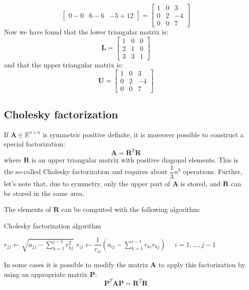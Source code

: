 \documentclass[12pt, a4paper]{report}
\begin{document}
\begin{example}
\[\begin{bmatrix}
            0-0 & 6-6 & -5+12
        \end{bmatrix}=
        \begin{bmatrix}
            1 & 0 & 3 \\
            0 & 2 & -4 \\
            0 & 0 & 7
        \end{bmatrix}\]
        Now we have found that the lower triangular matrix is: 
        \[\boldsymbol{L}=
        \begin{bmatrix}
            1 & 0 & 0 \\
            2 & 1 & 0 \\
            3 & 3 & 1
        \end{bmatrix}\]
        and that the upper triangular matrix is: 
        \[\boldsymbol{U}=
        \begin{bmatrix}
            1 & 0 & 3 \\
            0 & 2 & -4 \\
            0 & 0 & 7
        \end{bmatrix}\]
    \end{example}

    \subsection{Cholesky factorization}
    If $\boldsymbol{A} \in \mathbb{R}^{n \times n}$ is symmetric positive definite, it is moreover possible to construct a special factorization: 
    \[\boldsymbol{A}=\boldsymbol{R}^T\boldsymbol{R}\]
    where $\boldsymbol{R}$ is an upper triangular matrix with positive diagonal elements. This is the so-called Cholesky factorization and requires about $\dfrac{1}{3}n^3$
    operations. Further, let's note that, due to symmetry, only the upper part of $\boldsymbol{A}$ is stored, and $\boldsymbol{R}$ can be stored in the same area. 

    The elements of $\boldsymbol{R}$ can be computed with the following algorithm: 
    \begin{algorithm}[H]
        \caption{Cholesky factorization algorithm}
            \begin{algorithmic}
                \State $r_{jj}\leftarrow\sqrt{a_{jj}-\sum_{k=1}^{j-1}r_{kj}^2}$
                \State $r_{ij}\leftarrow\dfrac{1}{r_{ii}}\left(a_{ij}-\sum_{k=1}^{i-1}r_{ki}r_{kj}\right) \:\:\:\:\:\: i = 1,\dots,j-1$
            \end{algorithmic}
    \end{algorithm}
    In some cases it is possible to modify the matrix $\boldsymbol{A}$ to apply this factorization by using an appropriate matrix $\boldsymbol{P}$: 
    \[\boldsymbol{P}^T\boldsymbol{AP}=\boldsymbol{R}^T\boldsymbol{R}\]
\end{document}
